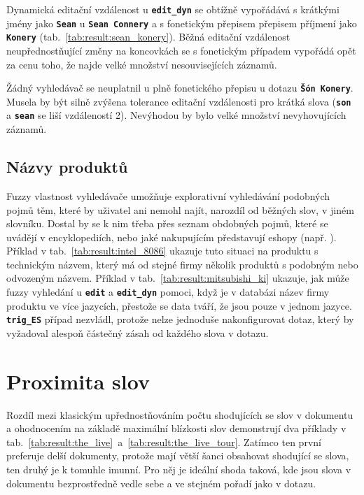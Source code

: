 \documentclass[11pt,letterpaper,oneside,openright]{book}
\newcommand{\bftt}[1]{\texttt{\textbf{#1}}}
\begin{document}
\mbox{}\mbox{}

Dynamická editační vzdálenost u \bftt{edit\_dyn} se obtížně vypořádává s
krátkými jmény jako \bftt{Sean} u \bftt{Sean Connery} a s fonetickým přepisem
přepisem příjmení jako \bftt{Konery} (tab.~\ref{tab:result:sean_konery}). Běžná
editační vzdálenost neupřednostňující změny na koncovkách se s fonetickým
případem vypořádá opět za cenu toho, že najde velké množství nesouvisejících
záznamů.

Žádný vyhledávač se neuplatnil u plně fonetického přepisu u dotazu \bftt{Šón
Konery}. Musela by být silně zvýšena tolerance editační vzdálenosti pro krátká
slova (\bftt{son} a \bftt{sean} se liší vzdáleností 2). Nevýhodou by bylo velké
množství nevyhovujících záznamů.

\subsection{Názvy produktů}

\mbox{}\mbox{}

Fuzzy vlastnost vyhledávače umožňuje explorativní vyhledávání podobných pojmů
těm, které by uživatel ani nemohl najít, narozdíl od běžných slov, v jiném
slovníku. Dostal by se k nim třeba přes seznam obdobných pojmů, které se
uvádějí v encyklopediích, nebo jaké nakupujícím představují eshopy (např.
). Příklad v tab.~\ref{tab:result:intel_8086}
ukazuje tuto situaci na produktu s technickým názvem, který má od stejné firmy
několik produktů s podobným nebo odvozeným názvem. Příklad v
tab.~\ref{tab:result:mitsubishi_ki} ukazuje, jak může fuzzy vyhledání u
\bftt{edit} a \bftt{edit\_dyn} pomoci, když je v databázi název firmy produktu
ve více jazycích, přestože se data tváří, že jsou pouze v jednom jazyce.
\bftt{trig\_ES} případ nezvládl, protože nelze jednoduše nakonfigurovat dotaz,
který by vyžadoval alespoň částečný zásah od každého slova v dotazu.

\mbox{}\mbox{}




\section{Proximita slov}
Rozdíl mezi klasickým upřednostňováním počtu shodujících se slov v
dokumentu a ohodnocením na základě maximální blízkosti slov demonstrují
dva příklady v
tab.~\ref{tab:result:the_live}~a~\ref{tab:result:the_live_tour}. Zatímco
ten první preferuje delší dokumenty, protože mají větší šanci obsahovat
shodující se slova, ten druhý je k tomuhle imunní. Pro něj je ideální
shoda taková, kde jsou slova v dokumentu bezprostředně vedle sebe a ve
stejném pořadí jako v dotazu.
\end{document}
